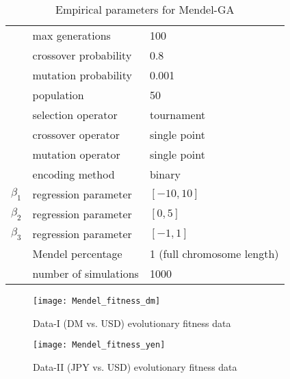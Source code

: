 \begin{table}[h!]
\caption{Empirical parameters for Mendel-GA } %
\centering %
\begin{tabular}{lll}
\hline
               & max generations                               & 100         \\
               & crossover probability                        & 0.8          \\
               & mutation probability                         & 0.001        \\
               & population                                   & 50          \\
               & selection operator                           & tournament   \\
               & crossover operator                           & single point \\
               & mutation operator                            & single point \\
               & encoding method                              & binary     \\
$\beta_1$   & regression parameter   & $[ -10 , 10 ]$  \\
$\beta_2$   & regression parameter   & $[ 0 , 5]$  \\
$\beta_3$   & regression parameter   & $[ -1 , 1]$  \\
$ $         & Mendel percentage      & 1 (full chromosome length)  \\
$ $         & number of simulations & 1000  \\
\hline
\end{tabular}
\label{tableGA} %
\end{table}

\begin{figure}[h!]
\centering
\texttt{[image: Mendel\_fitness\_dm]}
\caption{Data-I (DM vs. USD) evolutionary fitness data }
\label{Mendel_fitness_dm_dollar}
\end{figure}



\begin{figure}[h!]
\centering
\texttt{[image: Mendel\_fitness\_yen]}
\caption{Data-II (JPY vs. USD) evolutionary fitness data}
\label{Mendel_fitness_yen_dollar}
\end{figure}




